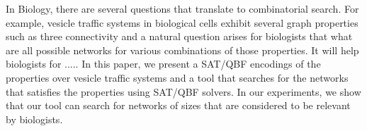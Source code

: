 In Biology, there are several questions that translate to combinatorial 
search.
%
For example, vesicle traffic systems in biological cells exhibit
several graph properties such as three connectivity and
a natural question arises for biologists that what are all possible
networks for various combinations of those properties.
%
It will help biologists for .....
%
In this paper, we present a SAT/QBF encodings of the properties over
vesicle traffic systems and a tool that searches for the networks
that satisfies the properties using SAT/QBF solvers.
%
In our experiments, we show that our tool can search for networks of
sizes that are considered to be relevant by biologists.



